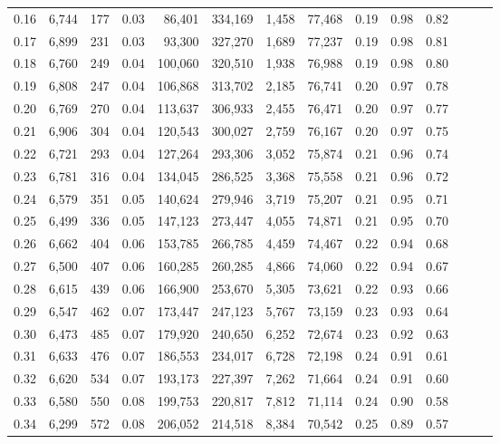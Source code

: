 \begin{tabular}{rrrrrrrrrrrrrr}
0.16 &  6,744 &    177 &  0.03 &   86,401 &  334,169 &   1,458 &  77,468 &  0.19 &  0.98 &      0.82 \\
0.17 &  6,899 &    231 &  0.03 &   93,300 &  327,270 &   1,689 &  77,237 &  0.19 &  0.98 &      0.81 \\
0.18 &  6,760 &    249 &  0.04 &  100,060 &  320,510 &   1,938 &  76,988 &  0.19 &  0.98 &      0.80 \\
0.19 &  6,808 &    247 &  0.04 &  106,868 &  313,702 &   2,185 &  76,741 &  0.20 &  0.97 &      0.78 \\
0.20 &  6,769 &    270 &  0.04 &  113,637 &  306,933 &   2,455 &  76,471 &  0.20 &  0.97 &      0.77 \\
0.21 &  6,906 &    304 &  0.04 &  120,543 &  300,027 &   2,759 &  76,167 &  0.20 &  0.97 &      0.75 \\
0.22 &  6,721 &    293 &  0.04 &  127,264 &  293,306 &   3,052 &  75,874 &  0.21 &  0.96 &      0.74 \\
0.23 &  6,781 &    316 &  0.04 &  134,045 &  286,525 &   3,368 &  75,558 &  0.21 &  0.96 &      0.72 \\
0.24 &  6,579 &    351 &  0.05 &  140,624 &  279,946 &   3,719 &  75,207 &  0.21 &  0.95 &      0.71 \\
0.25 &  6,499 &    336 &  0.05 &  147,123 &  273,447 &   4,055 &  74,871 &  0.21 &  0.95 &      0.70 \\
0.26 &  6,662 &    404 &  0.06 &  153,785 &  266,785 &   4,459 &  74,467 &  0.22 &  0.94 &      0.68 \\
0.27 &  6,500 &    407 &  0.06 &  160,285 &  260,285 &   4,866 &  74,060 &  0.22 &  0.94 &      0.67 \\
0.28 &  6,615 &    439 &  0.06 &  166,900 &  253,670 &   5,305 &  73,621 &  0.22 &  0.93 &      0.66 \\
0.29 &  6,547 &    462 &  0.07 &  173,447 &  247,123 &   5,767 &  73,159 &  0.23 &  0.93 &      0.64 \\
0.30 &  6,473 &    485 &  0.07 &  179,920 &  240,650 &   6,252 &  72,674 &  0.23 &  0.92 &      0.63 \\
0.31 &  6,633 &    476 &  0.07 &  186,553 &  234,017 &   6,728 &  72,198 &  0.24 &  0.91 &      0.61 \\
0.32 &  6,620 &    534 &  0.07 &  193,173 &  227,397 &   7,262 &  71,664 &  0.24 &  0.91 &      0.60 \\
0.33 &  6,580 &    550 &  0.08 &  199,753 &  220,817 &   7,812 &  71,114 &  0.24 &  0.90 &      0.58 \\
0.34 &  6,299 &    572 &  0.08 &  206,052 &  214,518 &   8,384 &  70,542 &  0.25 &  0.89 &      0.57 \\

\end{tabular}
